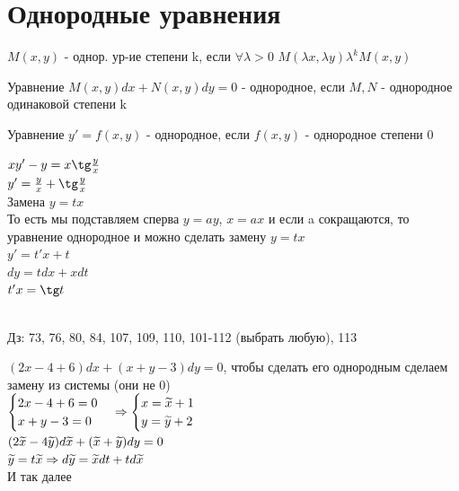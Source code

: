 \documentclass[12pt, fleqn]{article}
\begin{document}
\section{Однородные уравнения}
\begin{definition}
    $M(x,y)$ - однор. ур-ие степени k, если $\forall \lambda>0$ $M(\lambda x, \lambda y) \lambda^k M(x,y)$
\end{definition}

\begin{definition}
    Уравнение $M(x,y) dx + N(x,y) dy=0$ - однородное, если $M,N$ - однородное одинаковой степени k
\end{definition}

\begin{definition}
    Уравнение $y'=f(x,y)$ - однородное, если $f(x,y)$ - однородное степени 0
\end{definition}

\begin{example}
    $x y'-y=x \tg \frac{y}{x}$\\
    $y'=\frac{y}{x}+\tg \frac{y}{x}$\\
    Замена $y=t x$\\
    То есть мы подставляем сперва $y=ay$, $x=ax$ и если a сокращаются, то уравнение однородное и можно сделать замену $y=tx$\\
    $y'=t' x+t$\\
    $dy=t dx+x dt$\\
    $t' x = \tg t$
\end{example}
\\
Дз: 73, 76, 80, 84, 107, 109, 110, 101-112 (выбрать любую), 113

\begin{example}
    $(2x-4+6)dx+(x+y-3)dy=0$, чтобы сделать его однородным сделаем замену из системы (они не 0)\\
    $\begin{cases} 2x-4+6 = 0 \\ x+y-3=0 \end{cases} \Rightarrow \begin{cases} x=\widetilde{x}+1 \\ y=\widetilde{y}+2 \end{cases}$\\
    $(2\widetilde{x}-4\widetilde{y})d\widetilde{x}+(\widetilde{x}+\widetilde{y})d{y}=0$\\
    $\widetilde{y}=t\widetilde{x} \Rightarrow d\widetilde{y}=\widetilde{x}dt+td\widetilde{x}$\\
    И так далее
\end{example}
\end{document}

